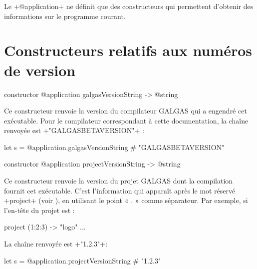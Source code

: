 

Le \ggs+@application+ ne définit que des constructeurs qui permettent d'obtenir des informations sur le programme courant.


\section{Constructeurs relatifs aux numéros de version}


\begin{galgasbox}
constructor @application galgasVersionString -> @string
\end{galgasbox}

Ce constructeur renvoie la version du compilateur GALGAS qui a engendré cet exécutable. Pour le compilateur correspondant à cette documentation, la chaîne renvoyée est \ggs+"GALGASBETAVERSION"+ :
\begin{galgas}
let s = @application.galgasVersionString # "GALGASBETAVERSION"
\end{galgas}









\begin{galgasbox}
constructor @application projectVersionString -> @string
\end{galgasbox}

Ce constructeur renvoie la version du projet GALGAS dont la compilation fournit cet exécutable. C'est l'information qui apparaît après le mot réservé \ggs+project+ (voir ), en utilisant le point « . » comme séparateur. Par exemple, si l'en-tête du projet est :

\begin{galgas}
project (1:2:3) -> "logo" {
  ...
}
\end{galgas}

La chaîne renvoyée est \ggs+"1.2.3"+:
\begin{galgas}
let s = @application.projectVersionString # "1.2.3"
\end{galgas}










